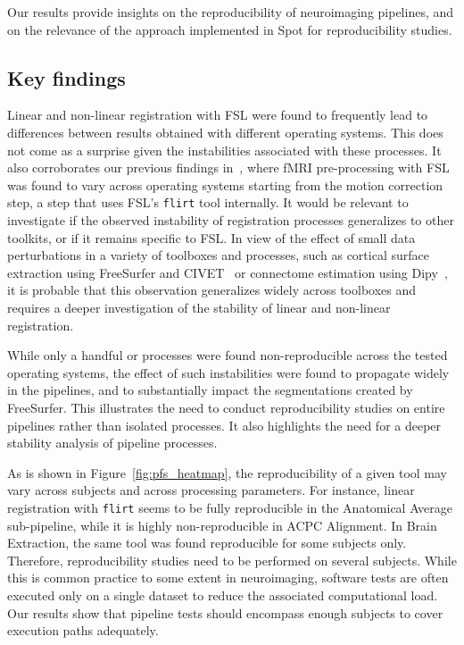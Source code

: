 \documentclass[a4paper,num-refs]{oup-contemporary}
\newcommand{\toolname}[0]{Spot\xspace}
\newcommand{\flirt}[0]{\texttt{flirt}\xspace}
\begin{document}
Our results provide insights on the reproducibility of
neuroimaging pipelines, and on the relevance of the approach implemented
in \toolname for reproducibility studies.

\subsection{Key findings}
Linear and non-linear registration with FSL were found to
frequently lead to differences between results obtained with different
operating systems. This does not come as a surprise given the instabilities
associated with these processes. It also corroborates our previous findings
in~\cite{Glatard2015}, where fMRI pre-processing with FSL was found to vary across operating systems 
starting from the motion
correction step, a step that uses FSL's \flirt tool internally. It
would be relevant to investigate if the observed instability of
registration processes generalizes to other toolkits, or if it remains specific
to FSL. In view of the effect of small data perturbations in a variety of
toolboxes and processes, such as cortical surface extraction using
FreeSurfer and CIVET~\cite{Lewis2017-ll} or connectome estimation using
Dipy~\cite{kiar2019comparing}, it is probable that this observation
generalizes widely across toolboxes and requires a deeper investigation of
the stability of linear and non-linear registration.

While only a handful or processes were found non-reproducible across the
tested operating systems, the effect of such instabilities were found to
propagate widely in the pipelines, and to substantially impact the segmentations
created by FreeSurfer. This illustrates the need to conduct reproducibility studies
on entire pipelines rather than isolated processes. It also highlights the need 
for a deeper stability analysis of pipeline processes.

As is shown in Figure~\ref{fig:pfs_heatmap}, the reproducibility of
a given tool may vary across subjects and across processing parameters. For
instance, linear registration with \flirt seems to be fully reproducible in
the Anatomical Average sub-pipeline, while it is highly non-reproducible in
ACPC Alignment. In Brain Extraction, the same tool was found reproducible
for some subjects only. Therefore, reproducibility studies need to be
performed on several subjects. While this is common practice to some extent in neuroimaging, 
software tests are often executed only on a single dataset to reduce the
associated computational load. Our results show that pipeline tests should 
encompass enough subjects to cover execution paths adequately.
\end{document}
